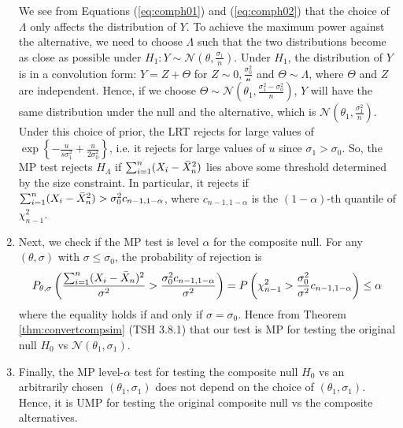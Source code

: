 \begin{example}
\begin{enumerate}
        We see from Equations (\ref{eq:comph01}) and (\ref{eq:comph02}) 
        that the choice of $\Lambda$ only affects the distribution of $Y$.
        To achieve the maximum power against the alternative,
        we need to choose $\Lambda$ such that 
        the two distributions become as close as possible under $H_1:Y\sim\mathcal{N}(\theta,\frac{\sigma_1}{n})$.
        Under $H_1$, the distribution of $Y$ is in a convolution form:
        $Y=Z+\Theta$ for $Z\sim\mathcal{0,\frac{\sigma_0^2}{n}}$ and $\Theta\sim \Lambda$,
        where $\Theta$ and $Z$ are independent.
        Hence, if we choose $\Theta\sim\mathcal{N}(\theta_1,\frac{\sigma_1^2-\sigma_0^2}{n})$,
        $Y$ will have the same distribution under the null and the alternative,
        which is $\mathcal{N}(\theta_1,\frac{\sigma_1^2}{n})$.
        Under this choice of prior,
        the LRT rejects for large values of $\exp\left\{-\frac{u}{s\sigma_1^2}+\frac{u}{2\sigma_0^2}\right\}$,
        i.e. it rejects for large values of $u$ since $\sigma_1>\sigma_0$.
        So, the MP test rejects $H_\Lambda$ 
        if $\sum_{i=1}^n(X_i-\Bar{X}_n^2)$ lies above some threshold determined by the size constraint.
        In particular, it rejects if $\sum_{i=1}^n(X_i-\Bar{X}_n^2)>\sigma_0^2c_{n-1,1-\alpha}$,
        where $c_{n-1,1-\alpha}$ is the $(1-\alpha)$-th quantile of $\chi^2_{n-1}$.

        \item Next, we check if the MP test is level $\alpha$ for the composite null.
        For any $(\theta,\sigma)$ with $\sigma\leq\sigma_0$, the probability of rejection is 
        {\footnotesize\begin{gather}
            P_{\theta,\sigma}\left( 
                \frac{\sum_{i=1}^n(X_i-\Bar{X}_n)^2}{\sigma^2}
                > \frac{\sigma_0^2 c_{n-1,1-\alpha}}{\sigma^2} 
            \right)
            = P\left(
                \chi_{n-1}^2
                > \frac{\sigma_0^2}{\sigma^2} c_{n-1,1-\alpha}
            \right)
            \leq \alpha
        \end{gather}}
        where the equality holds if and only if $\sigma=\sigma_0$.
        Hence from Theorem \ref{thm:convertcompsim} (TSH 3.8.1) that our test is MP for testing the
        original null $H_0$ vs $\mathcal{N}(\theta_1,\sigma_1)$.
        \item Finally, the MP level-$\alpha$ test for testing 
        the composite null $H_0$ vs an arbitrarily chosen $(\theta_1,\sigma_1)$ does not depend on the choice of $(\theta_1,\sigma_1)$.
        Hence, it is UMP for testing the original composite null vs the composite alternatives.
    \end{enumerate}
\end{example}

